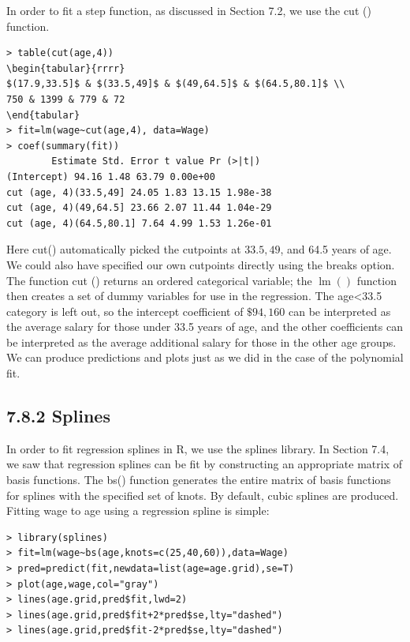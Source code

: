 \documentclass[10pt]{article}
\begin{document}
In order to fit a step function, as discussed in Section 7.2, we use the cut () function.

\begin{verbatim}
> table(cut(age,4))
\begin{tabular}{rrrr}
$(17.9,33.5]$ & $(33.5,49]$ & $(49,64.5]$ & $(64.5,80.1]$ \\
750 & 1399 & 779 & 72
\end{tabular}
> fit=lm(wage~cut(age,4), data=Wage)
> coef(summary(fit))
        Estimate Std. Error t value Pr (>|t|)
(Intercept) 94.16 1.48 63.79 0.00e+00
cut (age, 4)(33.5,49] 24.05 1.83 13.15 1.98e-38
cut (age, 4)(49,64.5] 23.66 2.07 11.44 1.04e-29
cut (age, 4)(64.5,80.1] 7.64 4.99 1.53 1.26e-01
\end{verbatim}

Here cut() automatically picked the cutpoints at $33.5,49$, and 64.5 years of age. We could also have specified our own cutpoints directly using the breaks option. The function cut () returns an ordered categorical variable; the $\operatorname{lm}()$ function then creates a set of dummy variables for use in the regression. The age<33.5 category is left out, so the intercept coefficient of $\$ 94,160$ can be interpreted as the average salary for those under 33.5 years of age, and the other coefficients can be interpreted as the average additional salary for those in the other age groups. We can produce predictions and plots just as we did in the case of the polynomial fit.

\subsection*{7.8.2 Splines}
In order to fit regression splines in R, we use the splines library. In Section 7.4, we saw that regression splines can be fit by constructing an appropriate matrix of basis functions. The bs() function generates the entire matrix of basis functions for splines with the specified set of knots. By default, cubic splines are produced. Fitting wage to age using a regression spline is simple:

\begin{verbatim}
> library(splines)
> fit=lm(wage~bs(age,knots=c(25,40,60)),data=Wage)
> pred=predict(fit,newdata=list(age=age.grid),se=T)
> plot(age,wage,col="gray")
> lines(age.grid,pred$fit,lwd=2)
> lines(age.grid,pred$fit+2*pred$se,lty="dashed")
> lines(age.grid,pred$fit-2*pred$se,lty="dashed")
\end{verbatim}
\end{document}
